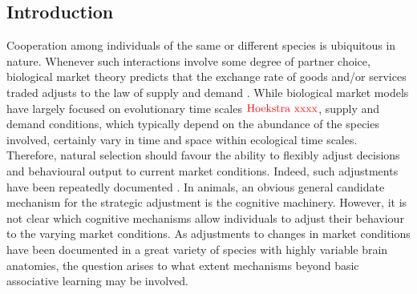 \documentclass[]{rsos}%
\begin{document}
\providecommand{\tightlist}{%
  \setlength{\itemsep}{0pt}\setlength{\parskip}{0pt}}
\providecommand{\EndFirstPage}{%
}

\maketitle

\hypertarget{introduction}{%
\subsection{Introduction}\label{introduction}}

Cooperation among individuals of the same or different species is
ubiquitous in nature. Whenever such interactions involve some degree
of partner choice, biological market theory predicts that the exchange
rate of goods and/or services traded adjusts to the law of supply and demand
\citep{noe_Biological_1995a}. While biological market models have largely focused
on evolutionary time scales \citep{noe_Biological_1994a, johnstone_Mutualism_2008a}
\(\color{red}{\text{Hoekstra xxxx}}\), supply and demand conditions, which typically
depend on the abundance of the species involved, certainly vary in time
and space within ecological time scales. Therefore, natural selection should
favour the ability to flexibly adjust decisions and behavioural output to
current market conditions. Indeed, such adjustments have been repeatedly
documented \citep{axen_Signalling_1996}. In animals, an obvious general candidate
mechanism for the strategic adjustment is the cognitive machinery. However,
it is not clear which cognitive mechanisms allow individuals to adjust their
behaviour to the varying market conditions. As adjustments to changes in
market conditions have been documented in a great variety of species with
highly variable brain anatomies, the question arises to what extent mechanisms
beyond basic associative learning may be involved.
\end{document}

